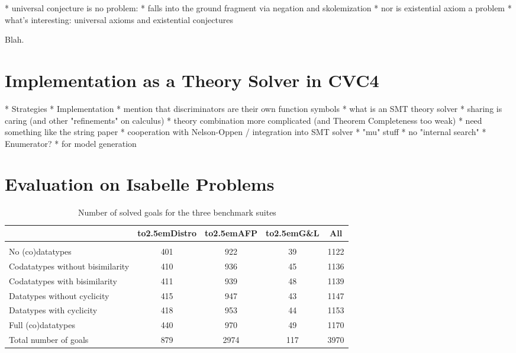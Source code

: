   * universal conjecture is no problem:
    * falls into the ground fragment via negation
      and skolemization
  * nor is existential axiom a problem
  * what's interesting: universal axioms and existential conjectures

Blah.

\section{Implementation as a Theory Solver in CVC4}
\label{sec:the-theory-solver}

  * Strategies
  * Implementation
    * mention that discriminators are their own function symbols
    * what is an SMT theory solver
    * sharing is caring (and other "refinements" on calculus)
    * theory combination more complicated (and Theorem Completeness too weak)
      * need something like the string paper
    * cooperation with Nelson-Oppen / integration into SMT solver
    * "mu" stuff
    * no "internal search"
  * Enumerator?
    * for model generation


\section{Evaluation on Isabelle Problems}
\label{sec:experimental-results}

\newcommand\gandl{G\&L}
\newcommand\HD[1]{\hbox to2.5em{\hfill#1\hfill}}

\begin{table*}[tbh!]
\normalsize
\begin{center}\begin{tabular}{l@{\kern1.5em}c@{\kern.5em}c@{\kern.5em}c@{\kern1.5em}c}
  & \HD{Distro} & \HD{AFP} & \HD{\gandl} & All
\\[1pt] %
\midrule
\\[-9pt] %
No (co)datatypes
  & 401 & 922 & \phantom{0}39 & 1122 \\
Codatatypes without bisimilarity
  & 410 & 936 & \phantom{0}45 & 1136 \\
Codatatypes with bisimilarity
  & 411 & 939 & \phantom{0}48 & 1139 \\
Datatypes without cyclicity
  & 415 & 947 & \phantom{0}43 & 1147 \\
Datatypes with cyclicity
  & 418 & 953 & \phantom{0}44 & 1153 \\
Full (co)datatypes
  & 440 & 970 & \phantom{0}49 & 1170 \\[\jot]
Total number of goals
  & 879 & 2974\phantom{0} & 117 & 3970
\end{tabular}\end{center}
\caption{\,Number of solved goals for the three benchmark suites}
\label{tab:bench}
\end{table*}

